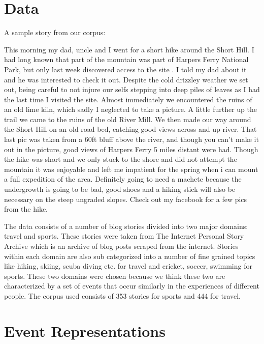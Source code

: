 \documentclass[12pt]{article}
\begin{document}
\section{Data}
A sample story from our corpus: \\
\begin{mdframed}
	\small This morning my dad, uncle and I went for a short hike around the Short Hill. I had long known that part of the mountain was part of Harpers Ferry National Park, but only last week discovered access to the site . I told my dad about it and he was interested to check it out. Despite the cold drizzley weather we set out, being careful to not injure our selfs stepping into deep piles of leaves as I had the last time I visited the site. Almost immediately we encountered the ruins of an old lime kiln, which sadly I neglected to take a picture. A little further up the trail we came to the ruins of the old River Mill. We then made our way around the Short Hill on an old road bed, catching good views across and up river. That last pic was taken from a 60ft bluff above the river, and though you can't make it out in the picture, good views of Harpers Ferry 5 miles distant were had. Though the hike was short and we only stuck to the shore and did not attempt the mountain it was enjoyable and left me impatient for the spring when i can mount a full expedition of the area. Definitely going to need a machete because the undergrowth is going to be bad, good shoes and a hiking stick will also be necessary on the steep ungraded slopes. Check out my facebook for a few pics from the hike. 
\end{mdframed} 
\vspace{2em}
The data consists of a number of blog stories divided into two major domains:  travel and sports. These stories were taken from The Internet Personal Story Archive\cite{ipsa} which is an  archive of blog posts scraped from the internet. Stories within each domain are also sub categorized into a number of fine grained topics like hiking, skiing, scuba diving etc. for travel and cricket, soccer, swimming for sports. These two domains were chosen because we think these two are characterized by a set of events that occur similarly in the experiences of different people. The corpus used consists of 353 stories for sports and 444 for travel.

\section{Event Representations}
\end{document}
